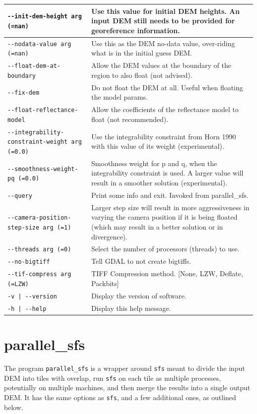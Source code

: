 \begin{longtable}{|l|p{7.5cm}|}
\texttt{-\/-init-dem-height arg (=nan)} & Use this value for initial DEM heights. An input DEM still needs to be provided for georeference information.\\ \hline
\texttt{-\/-nodata-value arg (=nan)} & Use this as the DEM no-data value, over-riding what is in the initial guess DEM.\\ \hline
\texttt{-\/-float-dem-at-boundary} & Allow the DEM values at the boundary of the region to also float (not advised).\\ \hline
\texttt{-\/-fix-dem} & Do not float the DEM at all. Useful when floating the model params.\\ \hline
\texttt{-\/-float-reflectance-model} & Allow the coefficients of the reflectance model to float (not recommended).\\ \hline
\texttt{-\/-integrability-constraint-weight arg (=0.0)} & Use the integrability constraint from Horn 1990 with this value of its weight (experimental).\\ \hline
\texttt{-\/-smoothness-weight-pq (=0.0)} & Smoothness weight for p and q, when the integrability constraint is used. A larger value will result in a smoother solution (experimental).\\ \hline
\texttt{-\/-query} & Print some info and exit. Invoked from parallel\_sfs.\\ \hline
\texttt{-\/-camera-position-step-size arg (=1)} & Larger step size will result in more aggressiveness in varying the camera position if it is being floated (which may result in a better solution or in divergence).\\ \hline
\texttt{-\/-threads arg (=0)} & Select the number of processors (threads) to use.\\ \hline
\texttt{-\/-no-bigtiff} & Tell GDAL to not create bigtiffs.\\ \hline
\texttt{-\/-tif-compress arg (=LZW)} & TIFF Compression method. [None, LZW, Deflate, Packbits]\\ \hline
\texttt{-v | -\/-version } & Display the version of software.\\ \hline
\texttt{-h | -\/-help } & Display this help message.\\ \hline
\end{longtable}

\section{parallel\_sfs}
\label{psfs}

The program \texttt{parallel\_sfs} is a wrapper around \texttt{sfs}
meant to divide the input DEM into tiles with overlap, run \texttt{sfs} 
on each tile as multiple processes, potentially on multiple machines,
and then merge the results into a single output DEM. It has the same
options as \texttt{sfs}, and a few additional ones, as outlined below.

